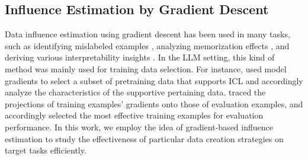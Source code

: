 \subsection{Influence Estimation by Gradient Descent}

Data influence estimation using gradient descent has been used in many tasks, such as identifying mislabeled examples \cite{pruthi2020estimating}, analyzing memorization effects \cite{feldman2020neural}, and deriving various interpretability insights \cite{madsen2022post}. In the LLM setting, this kind of method was mainly used for training data selection. For instance, \cite{han2023understanding} used model gradients to select a subset of pretraining data
that supports ICL and accordingly analyze the characteristics of the supportive pertaining data. \cite{engstromdsdm,xialess} traced the projections of training examples' gradients onto those of evaluation examples, and accordingly selected the most effective training examples for evaluation performance. In this work, we employ the idea of gradient-based influence estimation to study the effectiveness of particular data creation strategies on target tasks efficiently.